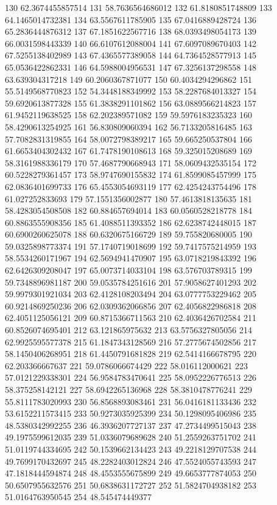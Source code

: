 {130 62.3674455857514
131 58.7636564686012
132 61.8180851748809
133 64.1465014732381
134 63.5567611785905
135 67.0416889428724
136 65.2836444876312
137 67.1851622567716
138 68.0393498054173
139 66.0031598443339
140 66.6107612088004
141 67.6097089670403
142 67.5255138402989
143 67.4365577389058
144 64.7364528577913
145 65.0536422862331
146 64.5988004956531
147 67.3256137298558
148 63.639304317218
149 60.2060367871077
150 60.4034294296862
151 55.5149568770823
152 54.3448188349992
153 58.2287684013327
154 59.6920613877328
155 61.3838291101862
156 63.0889566214823
157 61.9452119638525
158 62.202389571082
159 59.5976183235323
160 58.4290613254925
161 56.830809060394
162 56.7133205816485
163 57.7082831319855
164 58.0072798389217
165 59.665250537804
166 61.6653404302432
167 61.7478190108613
168 59.325015208689
169 58.3161988336179
170 57.4687790668943
171 58.0609432535154
172 60.5228279361457
173 58.9747690155832
174 61.8599085457999
175 62.0836401699733
176 65.4553054693119
177 62.4254243754496
178 61.027252833693
179 57.1551356002877
180 57.4613818135635
181 58.4283054508508
182 60.884657694014
183 60.0560528218778
184 60.8863555908356
185 61.4088511393352
186 62.6238742448015
187 60.6900260625078
188 60.6320675166729
189 59.755820680005
190 59.0325898773374
191 57.1740719018699
192 59.7417575214959
193 58.5534260171967
194 62.5694941470907
195 63.0718219843392
196 62.6426309208047
197 65.0073714033104
198 63.576703789315
199 59.7348896981187
200 59.0535784251616
201 57.9058627401293
202 59.9979301921034
203 62.4128108203494
204 63.0777753229462
205 60.9214869250236
206 62.0309362066856
207 62.4056822986818
208 62.4051125056121
209 60.8715366711563
210 62.4036426702584
211 60.8526074695401
212 63.121865975632
213 63.5756327805056
214 62.9925595577378
215 61.1847343128569
216 57.2775674502856
217 58.1450406268951
218 61.4450791681828
219 62.5414166678795
220 62.203366667637
221 59.0786066674429
222 58.016112000621
223 57.0121229338301
224 56.9584783470641
225 58.0952226776513
226 58.375258142121
227 58.6942265136968
228 58.3810478776241
229 55.8111783020993
230 56.8568893083461
231 56.0416181133436
232 53.6152211573415
233 50.9273035925399
234 50.1298095406986
235 48.5380342992255
236 46.3936207727137
237 47.2734499515043
238 49.1975599612035
239 51.0336079689628
240 51.2559263751702
241 51.0119744334695
242 50.1539662134423
243 49.2218129707538
244 49.7699170432697
245 48.2282403012824
246 47.5524055743593
247 47.1818444594874
248 48.4553555675899
249 49.6653777874053
250 50.6507955632576
251 50.6838631172727
252 51.5824704938182
253 51.0164763950545
254 48.545474449377
}
